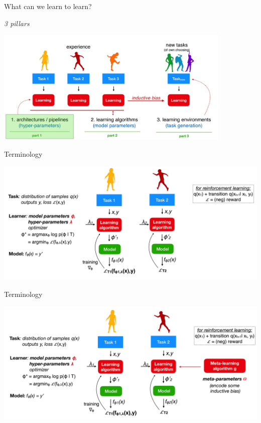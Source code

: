 \begin{frame}{What can we learn to learn?}
\centerline{\textit{3 pillars}}
\centering\includegraphics[height=5.5cm]{image/img194520.jpg}

\end{frame}
\begin{frame}{Terminology}

\centering\includegraphics[height=6cm]{image/img194743.jpg}

\end{frame}
\begin{frame}{Terminology}

\centering\includegraphics[height=6cm]{image/img194806.jpg}

\end{frame}

